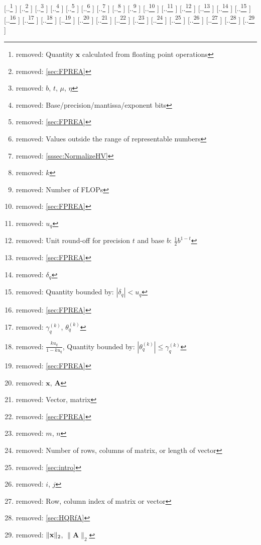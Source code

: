 \documentclass[review,onefignum,onetabnum]{siamart190516}
\newcommand{\dd}{\delta}
\newcommand{\tth}{\theta}
\newcommand{\bb}[1]{\mathbf{#1}}
\providecommand{\DIFdel}[1]{{\protect\color{red} [..\footnote{removed: #1} ]}} %
\providecommand{\DIFdelFL}[1]{\DIFdel{#1}} %
\begin{document}
\DIFdelFL{Quantity $\bb{x}$ calculated from floating point operations }%
\DIFdelFL{\ref{sec:FPREA} }%
\DIFdelFL{$b$, $t$, $\mu$, $\eta$  }%
\DIFdelFL{Base/precision/mantissa/exponent bits }%
\DIFdelFL{\ref{sec:FPREA} }%
\DIFdelFL{Values outside the range of representable numbers }%
\DIFdelFL{\ref{sssec:NormalizeHV} }%
		\DIFdelFL{$k$ }%
\DIFdelFL{Number of FLOPs }%
\DIFdelFL{\ref{sec:FPREA}}%
\DIFdelFL{$u_q$ }%
\DIFdelFL{Unit round-off for precision $t$ and base $b$: $\frac{1}{2}b^{1-t}$ }%
\DIFdelFL{\ref{sec:FPREA} }%
		\DIFdelFL{$\dd_{q}$ }%
\DIFdelFL{Quantity bounded by: $|\dd_{q}| < u_q$ }%
\DIFdelFL{\ref{sec:FPREA} }%
\DIFdelFL{$\gamma_{q}^{(k)}$,  $\tth_{q}^{(k)}$}%
\DIFdelFL{$\frac{ku_q}{1-ku_q}$, Quantity bounded by: $|\tth_{q}^{(k)}|\leq\gamma_q^{(k)}$ }%
\DIFdelFL{\ref{sec:FPREA} }%
\DIFdelFL{${\bb x}$, ${\bb A}$  }%
\DIFdelFL{Vector, matrix  }%
\DIFdelFL{\ref{sec:FPREA} }%
		\DIFdelFL{$m$, $n$ }%
\DIFdelFL{Number of rows, columns of matrix, or length of vector}%
\DIFdelFL{\ref{sec:intro}}%
\DIFdelFL{$i$, $j$ }%
\DIFdelFL{Row, column index of matrix or vector }%
\DIFdelFL{\ref{sec:HQRfA} }%
\DIFdelFL{$\|{\bf x}\|_2$, $\|\bb{A}\|_2$ }%
\end{document}
